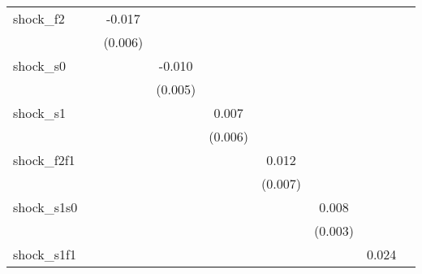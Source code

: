 {\begin{tabular}{l*{8}{c}}
\addlinespace
shock\_f2    &                     &      -0.017\sym{**} &                     &                     &                     &                     &                     &                     \\
            &                     &     (0.006)         &                     &                     &                     &                     &                     &                     \\
\addlinespace
shock\_s0    &                     &                     &      -0.010\sym{*}  &                     &                     &                     &                     &                     \\
            &                     &                     &     (0.005)         &                     &                     &                     &                     &                     \\
\addlinespace
shock\_s1    &                     &                     &                     &       0.007         &                     &                     &                     &                     \\
            &                     &                     &                     &     (0.006)         &                     &                     &                     &                     \\
\addlinespace
shock\_f2f1  &                     &                     &                     &                     &       0.012\sym{*}  &                     &                     &                     \\
            &                     &                     &                     &                     &     (0.007)         &                     &                     &                     \\
\addlinespace
shock\_s1s0  &                     &                     &                     &                     &                     &       0.008\sym{**} &                     &                     \\
            &                     &                     &                     &                     &                     &     (0.003)         &                     &                     \\
\addlinespace
shock\_s1f1  &                     &                     &                     &                     &                     &                     &       0.024\sym{**} &                     \\

\end{tabular}}
